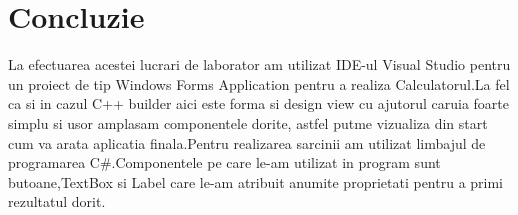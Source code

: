 \section*{Concluzie}
La efectuarea acestei lucrari de laborator am utilizat IDE-ul Visual Studio pentru un proiect de tip Windows Forms Application pentru a realiza Calculatorul.La fel ca si in cazul C++ builder aici este forma  si design view cu ajutorul caruia foarte simplu si usor amplasam componentele dorite, astfel putme vizualiza din start cum va arata aplicatia finala.Pentru realizarea sarcinii am utilizat limbajul de programarea \textsc{\large C\#}.Componentele pe care le-am utilizat in program sunt butoane,TextBox si Label care le-am atribuit anumite proprietati pentru a primi rezultatul dorit.

\clearpage